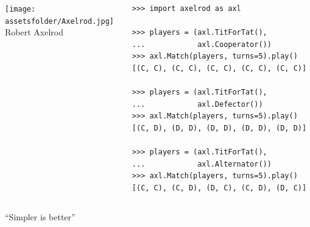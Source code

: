 \documentclass{beamer}
\newcommand{\assetsfolder}{./assets}
\newcommand{\researchfolder}{$HOME/rsc/axelrod-moran}
\begin{document}
    \begin{frame}[fragile]{}
        \begin{columns}
            \begin{column}{.4\textwidth}
                \begin{center}
                    \texttt{[image: \\assetsfolder/Axelrod.jpg]}
                    \\
                    Robert Axelrod
                \end{center}
            \end{column}
            \pause
            \begin{column}{.6\textwidth}
                \begin{verbatim}
>>> import axelrod as axl

>>> players = (axl.TitForTat(),
...            axl.Cooperator())
>>> axl.Match(players, turns=5).play()
[(C, C), (C, C), (C, C), (C, C), (C, C)]

>>> players = (axl.TitForTat(),
...            axl.Defector())
>>> axl.Match(players, turns=5).play()
[(C, D), (D, D), (D, D), (D, D), (D, D)]

>>> players = (axl.TitForTat(),
...            axl.Alternator())
>>> axl.Match(players, turns=5).play()
[(C, C), (C, D), (D, C), (C, D), (D, C)]

                \end{verbatim}
            \end{column}
        \end{columns}
\end{frame}

    \begin{frame}
        \begin{center}
            \Huge
            ``Simpler is better''
        \end{center}
    \end{frame}

    \begin{frame}
        \begin{center}
            \scalebox{.6}{}
        \end{center}
    \end{frame}
\end{document}
